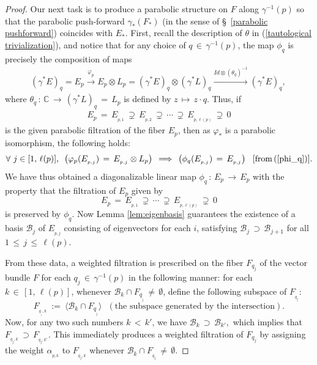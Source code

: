 \documentclass[10pt,reqno]{amsart}
\newcommand{\mc}[1]{\mathcal{#1}}
\newcommand{\bb}[1]{\mathbb{#1}}
\theoremstyle{myroman}
\numberwithin{equation}{section}
\begin{document}
\begin{proof}
			Our next task is to produce a parabolic structure on $F$ along $\gamma^{-1}(p)$ so that the parabolic push-forward $\gamma_*(F_*)$ (in the sense of \S~\ref{parabolic pushforward}) coincides with $E_*$. First, 
			recall the description of $\theta$ in (\ref{tautological trivialization}), and notice that for any choice of
			$q\,\in\, \gamma^{-1}(p)$, the map $\phi_q$ is precisely the composition of maps
			\begin{align}\label{phi_q}
				(\gamma^*E)_q=E_p\xrightarrow{\varphi_p} E_p\otimes L_p = (\gamma^*E)_q\otimes (\gamma^*L)_q\xrightarrow{Id\otimes(\theta_q)^{-1}}(\gamma^*E)_q,\,
			\end{align}
			where $\theta_q\,:\, \bb{C}\,\longrightarrow\, (\gamma^*L)_q\,=\,L_p$ is defined by
			$z\,\longmapsto\, z\cdot q$. Thus, if
			\begin{align*}
				E_p\,=\,E_{_{p,1}}\,\supsetneq \,E_{_{p,2}}\,\supsetneq\,\cdots\,\supsetneq\,E_{_{p,\ell(p)}}\,\supsetneq\,0
			\end{align*}
			is the given parabolic filtration of the fiber $E_p$, then as $\varphi_*$ is a parabolic isomorphism, the following
			holds:
			\begin{align}
				\forall\ j\in[1,\,\ell(p)],\,\,\,\left(\varphi_p(E_{_{p,j}})\,=\,E_{_{p,j}}\otimes L_p\right)\,\implies\,\left(\phi_q(E_{_{p,j}})\,=\,E_{_{p,j}}\right)\,\,\,\,[\text{from}\,(\ref{phi_q})].
			\end{align}
			We have thus obtained a diagonalizable linear map $\phi_q\,:\,E_p\,\longrightarrow\, E_p$
			with the property that the filtration of $E_p$ given by
			\begin{equation*}
				E_p\,=\,E_{_{p,1}}
				\,\supsetneq\,\cdots\,\supsetneq\, E_{_{p,\ell(p)}}\,\supsetneq\,0
			\end{equation*}
			is preserved by $\phi_q$. Now Lemma \ref{lem:eigenbasis}
			guarantees the existence of a basis $\mc{B}_j$ of $E_{_{p,j}}$ consisting of eigenvectors for each
			$i$, satisfying  $\mc{B}_{j}\,\supset\,\mc{B}_{j+1}$ for all $1\,\leq\, j\,\leq\, \ell(p)$. 
			
			From these data, a weighted filtration is prescribed on the fiber $F_{q_j}$ of the vector bundle $F$ for each
			$q_j\,\in\, \gamma^{-1}(p)$ in the following manner: for each $k\,\in\,[1,\,\ell(p)]$, whenever
			$\mc{B}_{k}\cap F_{q_{_{j}}}\,\neq\,\emptyset$, define the following subspace of $F_{_{q_j}}$:
			$$F_{_{q_{_{j}},k}}\ :=\ \langle\mc{B}_{k}\cap F_{q_{_{j}}}\rangle\ \ \ (\text{the subspace generated by the
				intersection}).$$
			Now, for any two such numbers $k\,<\,k'$, we have
			$\mc{B}_k\,\supset\, \mc{B}_{k'},$ which implies that $F_{_{q_j,k}}\,\supset\, F_{_{q_j,k'}}.$
			This immediately produces a weighted filtration of $F_{q_{j}}$ by assigning the
			weight $\alpha_{_{p,k}}$ to   $F_{_{q_{j},k}}$ whenever $\mc{B}_k\cap F_{_{q_j}}\,\neq\,\emptyset$.
			

\end{proof}
\end{document}
